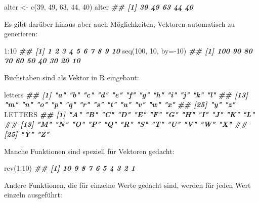 \documentclass[
  ngerman,
]{article}
\newenvironment{Shaded}{\begin{snugshade}}{\end{snugshade}}
\newcommand{\AttributeTok}[1]{\textcolor[rgb]{0.77,0.63,0.00}{#1}}
\newcommand{\DecValTok}[1]{\textcolor[rgb]{0.00,0.00,0.81}{#1}}
\newcommand{\DocumentationTok}[1]{\textcolor[rgb]{0.56,0.35,0.01}{\textbf{\textit{#1}}}}
\newcommand{\FunctionTok}[1]{\textcolor[rgb]{0.00,0.00,0.00}{#1}}
\newcommand{\NormalTok}[1]{#1}
\newcommand{\OtherTok}[1]{\textcolor[rgb]{0.56,0.35,0.01}{#1}}
\newcommand{\SpecialCharTok}[1]{\textcolor[rgb]{0.00,0.00,0.00}{#1}}
\begin{document}
\begin{Shaded}
\begin{Highlighting}[]
\NormalTok{alter }\OtherTok{\textless{}{-}} \FunctionTok{c}\NormalTok{(}\DecValTok{39}\NormalTok{, }\DecValTok{49}\NormalTok{, }\DecValTok{63}\NormalTok{, }\DecValTok{44}\NormalTok{, }\DecValTok{40}\NormalTok{)}
\NormalTok{alter}
\DocumentationTok{\#\# [1] 39 49 63 44 40}
\end{Highlighting}
\end{Shaded}

Es gibt darüber hinaus aber auch Möglichkeiten, Vektoren automatisch zu generieren:

\begin{Shaded}
\begin{Highlighting}[]
\DecValTok{1}\SpecialCharTok{:}\DecValTok{10}
\DocumentationTok{\#\#  [1]  1  2  3  4  5  6  7  8  9 10}
\FunctionTok{seq}\NormalTok{(}\DecValTok{100}\NormalTok{, }\DecValTok{10}\NormalTok{, }\AttributeTok{by=}\SpecialCharTok{{-}}\DecValTok{10}\NormalTok{)}
\DocumentationTok{\#\#  [1] 100  90  80  70  60  50  40  30  20  10}
\end{Highlighting}
\end{Shaded}

Buchstaben sind als Vektor in R eingebaut:

\begin{Shaded}
\begin{Highlighting}[]
\NormalTok{letters}
\DocumentationTok{\#\#  [1] "a" "b" "c" "d" "e" "f" "g" "h" "i" "j" "k" "l"}
\DocumentationTok{\#\# [13] "m" "n" "o" "p" "q" "r" "s" "t" "u" "v" "w" "x"}
\DocumentationTok{\#\# [25] "y" "z"}
\NormalTok{LETTERS}
\DocumentationTok{\#\#  [1] "A" "B" "C" "D" "E" "F" "G" "H" "I" "J" "K" "L"}
\DocumentationTok{\#\# [13] "M" "N" "O" "P" "Q" "R" "S" "T" "U" "V" "W" "X"}
\DocumentationTok{\#\# [25] "Y" "Z"}
\end{Highlighting}
\end{Shaded}

Manche Funktionen sind speziell für Vektoren gedacht:

\begin{Shaded}
\begin{Highlighting}[]
\FunctionTok{rev}\NormalTok{(}\DecValTok{1}\SpecialCharTok{:}\DecValTok{10}\NormalTok{)}
\DocumentationTok{\#\#  [1] 10  9  8  7  6  5  4  3  2  1}
\end{Highlighting}
\end{Shaded}

Andere Funktionen, die für einzelne Werte gedacht sind, werden für jeden Wert einzeln ausgeführt:
\end{document}
